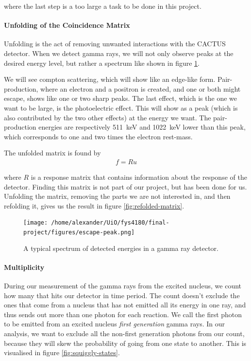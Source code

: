 \documentclass[a4paper,12pt]{article}
\newcommand{\eq}[1]{{\small\begin{align*}#1\end{align*}}}
\begin{document}
where the last step is a too large a task to be done
in this project.

\paragraph{Unfolding of the Coincidence Matrix}
Unfolding is the act of removing unwanted interactions with
the CACTUS detector. 
When we detect gamma rays, we
will not only observe peaks at the desired energy level,
but rather a spectrum like shown in figure \ref{fig:peaks}.

We will see compton scattering, which will show like an
edge-like form. Pair-production, where an electron and a
positron is created, and one or both might escape,
shows like one or two sharp peaks. 
The last effect, which is the one we want to be large,
is the photoelectric effect. This will show as a peak
(which is also contributed by the two other effects)
at the energy we want. The pair-production energies
are respectively \SI{511}{\kilo\electronvolt} 
and \SI{1022}{\kilo\electronvolt} lower than this peak,
which corresponds to one and two times the electron rest-mass.

The unfolded matrix is found by
\eq{f = Ru}

where $R$ is a response matrix that contains information
about the response of the detector.
Finding this matrix is not part of our project, but has been done for us.
Unfolding the matrix, removing the parts we are not interested in,
and then refolding it, gives us the result in figure \ref{fig:refolded-matrix}.

\begin{figure}[H]
    \centering
    \texttt{[image: /home/alexander/UiO/fys4180/final-project/figures/escape-peak.png]}
    \caption{A typical spectrum of detected energies in a gamma ray detector.}
    \label{fig:peaks}
\end{figure}


\paragraph{Multiplicity}
During our measurement of the gamma rays from the excited nucleus,
we count how many that hits our detector in time period.
The count doesn't exclude the ones that come from a nucleus
that has not emitted all its energy in one ray, and thus
sends out more than one photon for each reaction.
We call the first photon to be emitted from an excited nucleus
\textit{first generation} gamma rays. In our analysis,
we want to exclude all the non-first generation photons from
our count, because they will skew the probability of going
from one state to another.
This is visualised in figure \ref{fig:squiggly-states}.
\end{document}
